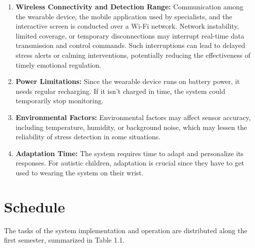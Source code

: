 \documentclass[a4paper,12pt]{report}
\begin{document}
\begin{enumerate}

\item \textbf{Wireless Connectivity and Detection Range:}
Communication among the wearable device, the mobile application used by specialists, and the interactive screen is conducted over a Wi-Fi network. Network instability, limited coverage, or temporary disconnections may interrupt real-time data transmission and control commands. Such interruptions can lead to delayed stress alerts or calming interventions, potentially reducing the effectiveness of timely emotional regulation.
\item \textbf{Power Limitations:}
Since the wearable device runs on battery power, it needs regular recharging. If it isn’t charged in time, the system could temporarily stop monitoring.
\item \textbf{Environmental Factors:}
Environmental factors may affect sensor accuracy, including temperature, humidity, or background noise, which may lessen the reliability of stress detection in some situations.
\item \textbf{Adaptation Time:}
The system requires time to adapt and personalize its responses. For autistic children, adaptation is crucial since they have to get used to wearing the system on their wrist.
\end{enumerate}

\newpage
\section{Schedule}
The tasks of the system implementation and operation are distributed along the first semester, summarized in Table 1.1.
\end{document}
